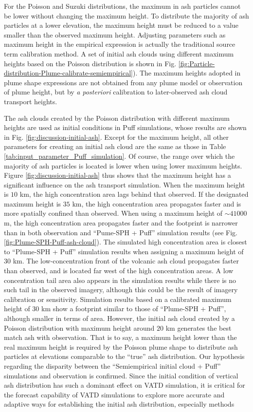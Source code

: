 \documentclass[utf8]{frontiersSCNS} %
\begin{document}
For the Poisson and Suzuki distributions, the maximum in ash particles cannot be lower without changing the maximum height. To distribute the majority of ash particles at a lower elevation, the maximum height must be reduced to a value smaller than the observed maximum height. Adjusting parameters such as maximum height in the empirical expression is actually the traditional source term calibration method. A set of initial ash clouds using different maximum heights based on the Poisson distribution is shown in Fig. \ref{fig:Particle-distribution-Plume-calibrate-semiempirical}). The maximum heights adopted in plume shape expressions are not obtained from any plume model or observation of plume height, but by \textit{a posteriori} calibration to later-observed ash cloud transport heights.

The ash clouds created by the Poisson distribution with different maximum heights are used as initial conditions in Puff simulations, whose results are shown in Fig. \ref{fig:discussion-initial-ash}. Except for the maximum height, all other parameters for creating an initial ash cloud are the same as those in Table \ref{tab:input_parameter_Puff_simulation}. Of course, the range over which the majority of ash particles is located is lower when using lower maximum heights.  Figure \ref{fig:discussion-initial-ash} thus shows that the maximum height has a significant influence on the ash transport simulation. When the maximum height is $10 $ km, the high concentration area  lags behind that observed.  If the designated maximum height is $35 $ km, the high concentration area propagates faster and is more spatially confined than observed. When using a maximum height of $\sim 41000$ m, the high concentration area propagates faster and the footprint is narrower than in both observation and ``Pume-SPH + Puff'' simulation results (see Fig. \ref{fig:Plume-SPH-Puff-ash-cloud}). The simulated high concentration area is closest to ``Plume-SPH + Puff'' simulation results when assigning a maximum height of $30$ km. The low-concentration front of the volcanic ash cloud propagates faster than observed, and is located far west of the high concentration areas. A low concentration tail area also appears in the simulation results while there is no such tail in the observed imagery, although this could be the result of imagery calibration or sensitivity. Simulation results based on a calibrated maximum height of $30 $ km show a footprint similar to those of ``Plume-SPH + Puff'', although smaller in terms of area. However, the initial ash cloud created by a Poisson distribution with maximum height around $20 $ km generates the best match ash with observation. That is to say, a maximum height lower than the real maximum height is required by the Poisson plume shape to distribute ash particles at elevations comparable to the ``true'' ash distribution. Our hypothesis regarding the disparity between the ``Semiempirical initial cloud + Puff'' simulations and observation is confirmed. Since the initial condition of vertical ash distribution has such a dominant effect on VATD simulation, it is critical for the forecast capability of VATD simulations to explore more accurate and adaptive ways for establishing the initial ash distribution, especially methods 
\end{document}
